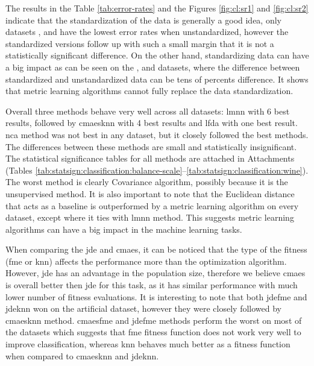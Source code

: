 \documentclass[12pt,a4paper]{report}
\begin{document}

The results in the Table \ref{tab:error-rates} and the Figures \ref{fig:cl:sr1} and \ref{fig:cl:sr2} indicate that the standardization of the data is generally a good idea, only datasets ,  and  have the lowest error rates when unstandardized, however the standardized versions follow up with such a small margin that it is not a statistically significant difference. On the other hand, standardizing data can have a big impact as can be seen on the ,  and  datasets, where the difference between standardized and unstandardized data can be tens of percents difference. It shows that metric learning algorithms cannot fully replace the data standardization.

Overall three methods behave very well across all datasets: \ac{lmnn} with 6 best results, followed by \ac{cmaesknn} with 4 best results and \ac{lfda} with one best result. \ac{nca} method was not best in any dataset, but it closely followed the best methods. The differences between these methods are small and statistically insignificant. The statistical significance tables for all methods are attached in Attachments (Tables \ref{tab:statsign:classification:balance-scale}--\ref{tab:statsign:classification:wine}). The worst method is clearly Covariance algorithm, possibly because it is the unsupervised method. It is also important to note that the Euclidean distance that acts as a baseline is outperformed by a metric learning algorithm on every dataset, except  where it ties with \ac{lmnn} method. This suggests metric learning algorithms can have a big impact in the machine learning tasks.

When comparing the \ac{jde} and \ac{cmaes}, it can be noticed that the type of the fitness (\ac{fme} or \ac{knn}) affects the performance more than the optimization algorithm. However, \ac{jde} has an advantage in the population size, therefore we believe \ac{cmaes} is overall better then \ac{jde} for this task, as it has similar performance with much lower number of fitness evaluations. It is interesting to note that both \ac{jdefme} and \ac{jdeknn} won on the artificial  dataset, however they were closely followed by \ac{cmaesknn} method. \ac{cmaesfme} and \ac{jdefme} methods perform the worst on most of the datasets which suggests that \ac{fme} fitness function does not work very well to improve classification, whereas \ac{knn} behaves much better as a fitness function when compared to \ac{cmaesknn} and \ac{jdeknn}.
\end{document}
